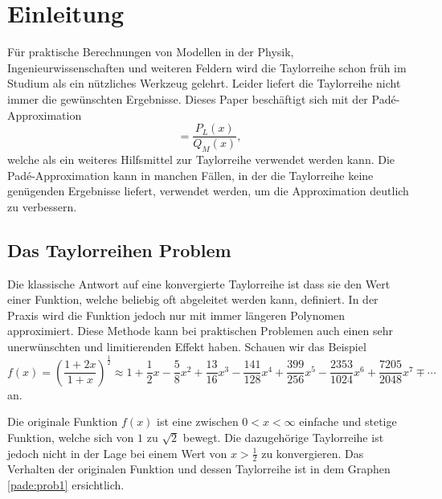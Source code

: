 %
%
%
\section{Einleitung\label{pade:section:einleitung}}
Für praktische Berechnungen von Modellen in der Physik, Ingenieurwissenschaften und weiteren Feldern wird die Taylorreihe schon früh im Studium als ein nützliches Werkzeug gelehrt.
Leider liefert die Taylorreihe nicht immer die gewünschten Ergebnisse.
Dieses Paper beschäftigt sich mit der Padé-Approximation 
\begin{equation*}
[L/M]
=
\frac{P_{L}(x)}{Q_{M}(x)},
\end{equation*}
welche als ein weiteres Hilfsmittel zur Taylorreihe verwendet werden kann.
Die Padé-Approximation kann in manchen Fällen, in der die Taylorreihe keine genügenden Ergebnisse liefert, verwendet werden, um die Approximation deutlich zu verbessern.

 

\subsection{Das Taylorreihen Problem
\label{pade:Taylorfehler}}

Die klassische Antwort auf eine konvergierte Taylorreihe ist dass sie den Wert einer Funktion, welche beliebig oft abgeleitet werden kann, definiert. 
In der Praxis wird die Funktion jedoch nur mit immer längeren Polynomen approximiert.
Diese Methode kann bei praktischen Problemen auch einen sehr unerwünschten und limitierenden Effekt haben. 
Schauen wir das Beispiel 
\begin{equation*}
f(x)
=
\left(\frac{1+2x}{1+x}\right)^{\frac{1}{2}}
\approx
1+\frac{1}{2}x - \frac{5}{8}x^2+\frac{13}{16}x^3 -\frac{141}{128}x^4 +\frac{399}{256}x^5 - \frac{2353}{1024}x^6 + \frac{7205}{2048}x^7 \mp \cdots
\end{equation*}
an. 

Die originale Funktion $f(x)$ ist eine zwischen $0<x<\infty$ einfache und stetige Funktion, welche sich von $1$ zu $\sqrt{2}$ bewegt.
Die dazugehörige Taylorreihe ist jedoch nicht in der Lage bei einem Wert von $x>\frac{1}{2}$ zu konvergieren. 
Das Verhalten der originalen Funktion und dessen Taylorreihe ist in dem Graphen \ref{pade:prob1} ersichtlich. 

